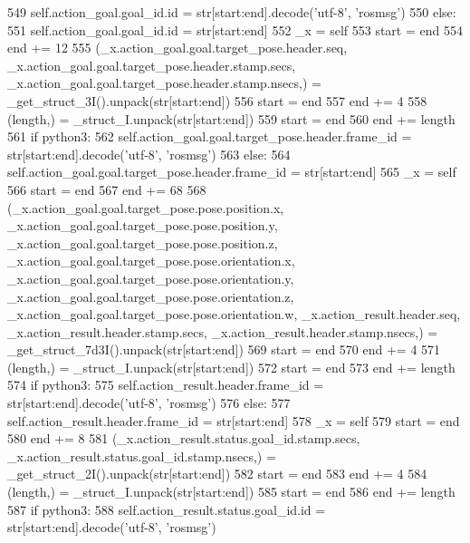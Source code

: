 \begin{DoxyCode}
549         self.action\_goal.goal\_id.id = str[start:end].decode(\textcolor{stringliteral}{'utf-8'}, \textcolor{stringliteral}{'rosmsg'})
550       \textcolor{keywordflow}{else}:
551         self.action\_goal.goal\_id.id = str[start:end]
552       \_x = self
553       start = end
554       end += 12
555       (\_x.action\_goal.goal.target\_pose.header.seq, \_x.action\_goal.goal.target\_pose.header.stamp.secs, 
      \_x.action\_goal.goal.target\_pose.header.stamp.nsecs,) = \_get\_struct\_3I().unpack(str[start:end])
556       start = end
557       end += 4
558       (length,) = \_struct\_I.unpack(str[start:end])
559       start = end
560       end += length
561       \textcolor{keywordflow}{if} python3:
562         self.action\_goal.goal.target\_pose.header.frame\_id = str[start:end].decode(\textcolor{stringliteral}{'utf-8'}, \textcolor{stringliteral}{'rosmsg'})
563       \textcolor{keywordflow}{else}:
564         self.action\_goal.goal.target\_pose.header.frame\_id = str[start:end]
565       \_x = self
566       start = end
567       end += 68
568       (\_x.action\_goal.goal.target\_pose.pose.position.x, \_x.action\_goal.goal.target\_pose.pose.position.y, 
      \_x.action\_goal.goal.target\_pose.pose.position.z, \_x.action\_goal.goal.target\_pose.pose.orientation.x, 
      \_x.action\_goal.goal.target\_pose.pose.orientation.y, \_x.action\_goal.goal.target\_pose.pose.orientation.z, 
      \_x.action\_goal.goal.target\_pose.pose.orientation.w, \_x.action\_result.header.seq, \_x.action\_result.header.stamp.secs, 
      \_x.action\_result.header.stamp.nsecs,) = \_get\_struct\_7d3I().unpack(str[start:end])
569       start = end
570       end += 4
571       (length,) = \_struct\_I.unpack(str[start:end])
572       start = end
573       end += length
574       \textcolor{keywordflow}{if} python3:
575         self.action\_result.header.frame\_id = str[start:end].decode(\textcolor{stringliteral}{'utf-8'}, \textcolor{stringliteral}{'rosmsg'})
576       \textcolor{keywordflow}{else}:
577         self.action\_result.header.frame\_id = str[start:end]
578       \_x = self
579       start = end
580       end += 8
581       (\_x.action\_result.status.goal\_id.stamp.secs, \_x.action\_result.status.goal\_id.stamp.nsecs,) = 
      \_get\_struct\_2I().unpack(str[start:end])
582       start = end
583       end += 4
584       (length,) = \_struct\_I.unpack(str[start:end])
585       start = end
586       end += length
587       \textcolor{keywordflow}{if} python3:
588         self.action\_result.status.goal\_id.id = str[start:end].decode(\textcolor{stringliteral}{'utf-8'}, \textcolor{stringliteral}{'rosmsg'})

\end{DoxyCode}

